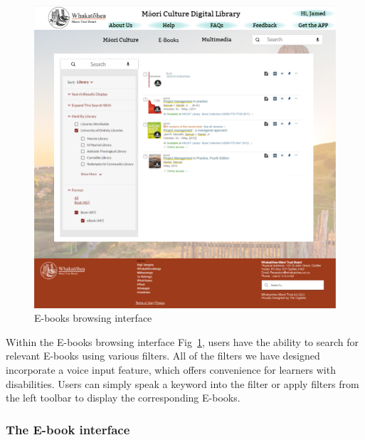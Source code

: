 \begin{figure}[htbp]
  \centerline{\includegraphics[width=400pt]{images/3-2-1.png}}
  \caption{E-books browsing interface}
  \label{fig3.2.1}
\end{figure}

Within the E-books browsing interface Fig~\ref{fig3.2.1}, users have the ability to search for relevant E-books using various filters. All of the filters we have designed incorporate a voice input feature, which offers convenience for learners with disabilities. Users can simply speak a keyword into the filter or apply filters from the left toolbar to display the corresponding E-books.

\subsubsection{The E-book interface}

